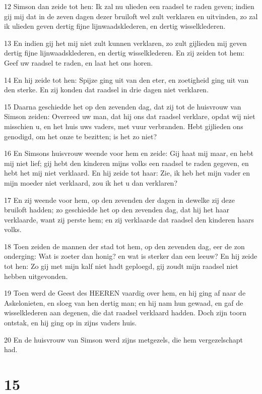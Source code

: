 \par 12 Simson dan zeide tot hen: Ik zal nu ulieden een raadsel te raden geven; indien gij mij dat in de zeven dagen dezer bruiloft wel zult verklaren en uitvinden, zo zal ik ulieden geven dertig fijne lijnwaadsklederen, en dertig wisselklederen.
\par 13 En indien gij het mij niet zult kunnen verklaren, zo zult gijlieden mij geven dertig fijne lijnwaadsklederen, en dertig wisselklederen. En zij zeiden tot hem: Geef uw raadsel te raden, en laat het ons horen.
\par 14 En hij zeide tot hen: Spijze ging uit van den eter, en zoetigheid ging uit van den sterke. En zij konden dat raadsel in drie dagen niet verklaren.
\par 15 Daarna geschiedde het op den zevenden dag, dat zij tot de huisvrouw van Simson zeiden: Overreed uw man, dat hij ons dat raadsel verklare, opdat wij niet misschien u, en het huis uws vaders, met vuur verbranden. Hebt gijlieden ons genodigd, om het onze te bezitten; is het zo niet?
\par 16 En Simsons huisvrouw weende voor hem en zeide: Gij haat mij maar, en hebt mij niet lief; gij hebt den kinderen mijns volks een raadsel te raden gegeven, en hebt het mij niet verklaard. En hij zeide tot haar: Zie, ik heb het mijn vader en mijn moeder niet verklaard, zou ik het u dan verklaren?
\par 17 En zij weende voor hem, op den zevenden der dagen in dewelke zij deze bruiloft hadden; zo geschiedde het op den zevenden dag, dat hij het haar verklaarde, want zij perste hem; en zij verklaarde dat raadsel den kinderen haars volks.
\par 18 Toen zeiden de mannen der stad tot hem, op den zevenden dag, eer de zon onderging: Wat is zoeter dan honig? en wat is sterker dan een leeuw? En hij zeide tot hen: Zo gij met mijn kalf niet hadt geploegd, gij zoudt mijn raadsel niet hebben uitgevonden.
\par 19 Toen werd de Geest des HEEREN vaardig over hem, en hij ging af naar de Askelonieten, en sloeg van hen dertig man; en hij nam hun gewaad, en gaf de wisselklederen aan degenen, die dat raadsel verklaard hadden. Doch zijn toorn ontstak, en hij ging op in zijns vaders huis.
\par 20 En de huisvrouw van Simson werd zijns metgezels, die hem vergezelschapt had.

\chapter{15}

